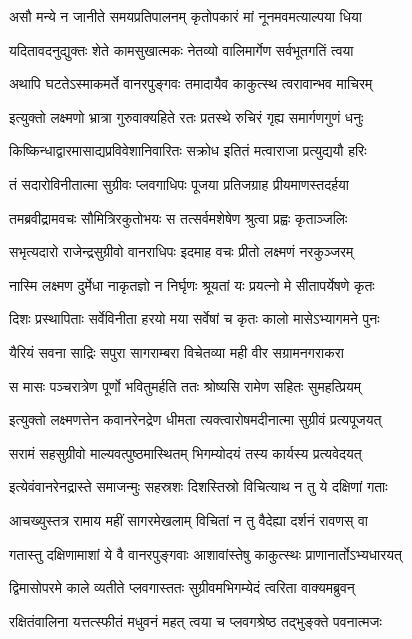 \twolineshloka
{असौ मन्ये न जानीते समयप्रतिपालनम्}
{कृतोपकारं मां नूनमवमत्याल्पया धिया}


\twolineshloka
{यदितावदनुद्युक्तः शेते कामसुखात्मकः}
{नेतव्यो वालिमार्गेण सर्वभूतगतिं त्वया}


\twolineshloka
{अथापि घटतेऽस्माकमर्ते वानरपुङ्गवः}
{तमादायैव काकुत्स्थ त्वरावान्भव माचिरम्}


\twolineshloka
{इत्युक्तो लक्ष्मणो भ्रात्रा गुरुवाक्यहिते रतः}
{प्रतस्थे रुचिरं गृह्य समार्गणगुणं धनुः}


\twolineshloka
{किष्किन्धाद्वारमासाद्यप्रविवेशानिवारितः}
{सक्रोध इतितं मत्वाराजा प्रत्युद्ययौ हरिः}


\twolineshloka
{तं सदारोविनीतात्मा सुग्रीवः प्लवगाधिपः}
{पूजया प्रतिजग्राह प्रीयमाणस्तदर्हया}


\twolineshloka
{तमब्रवीद्रामवचः सौमित्रिरकुतोभयः}
{स तत्सर्वमशेषेण श्रुत्वा प्रह्वः कृताञ्जलिः}


\twolineshloka
{सभृत्यदारो राजेन्द्रसुग्रीवो वानराधिपः}
{इदमाह वचः प्रीतो लक्ष्मणं नरकुञ्जरम्}


\twolineshloka
{नास्मि लक्ष्मण दुर्मेधा नाकृतज्ञो न निर्घृणः}
{श्रूयतां यः प्रयत्नो मे सीतापर्येषणे कृतः}


\twolineshloka
{दिशः प्रस्थापिताः सर्वेविनीता हरयो मया}
{सर्वेषां च कृतः कालो मासेऽभ्यागमने पुनः}


\twolineshloka
{यैरियं सवना साद्रिः सपुरा सागराम्बरा}
{विचेतव्या मही वीर सग्रामनगराकरा}


\twolineshloka
{स मासः पञ्चरात्रेण पूर्णो भवितुमर्हति}
{ततः श्रोष्यसि रामेण सहितः सुमहत्प्रियम्}


\twolineshloka
{इत्युक्तो लक्ष्मणत्तेन कवानरेनद्रेण धीमता}
{त्यक्त्वारोषमदीनात्मा सुग्रीवं प्रत्यपूजयत्}


\twolineshloka
{सरामं सहसुग्रीवो माल्यवत्पुष्ठमास्थितम्}
{भिगम्योदयं तस्य कार्यस्य प्रत्यवेदयत्}


\twolineshloka
{इत्येवंवानरेनद्रास्ते समाजन्मुः सहस्रशः}
{दिशस्तिस्रो विचित्याथ न तु ये दक्षिणां गताः}


\twolineshloka
{आचख्युस्तत्र रामाय महीं सागरमेखलाम्}
{विचितां न तु वैदेह्या दर्शनं रावणस् वा}


\twolineshloka
{गतास्तु दक्षिणामाशां ये वै वानरपुङ्गवाः}
{आशावांस्तेषु काकुत्स्थः प्राणानार्तोऽभ्यधारयत्}


\twolineshloka
{द्विमासोपरमे काले व्यतीते प्लवगास्ततः}
{सुग्रीवमभिगम्येदं त्वरिता वाक्यमब्रुवन्}


\twolineshloka
{रक्षितंवालिना यत्तत्स्फीतं मधुवनं महत्}
{त्वया च प्लवगश्रेष्ठ तद्भुङ्क्ते पवनात्मजः}


